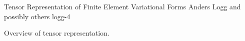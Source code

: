               {Tensor Representation of Finite Element Variational Forms}
              {Anders Logg and possibly others}
              {logg-4}

Overview of tensor representation.
